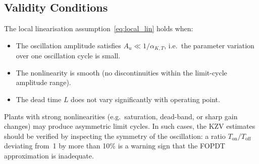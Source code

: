 \subsection{Validity Conditions}
\label{sec:nonlinear:validity}

The local linearisation assumption~\eqref{eq:local_lin} holds when:

\begin{itemize}
    \item The oscillation amplitude satisfies $A_u \ll 1/\alpha_{K,T}$,
          i.e.\ the parameter variation over one oscillation cycle is small.
    \item The nonlinearity is smooth (no discontinuities within the limit-cycle
          amplitude range).
    \item The dead time $L$ does not vary significantly with operating point.
\end{itemize}

Plants with strong nonlinearities (e.g.\ saturation, dead-band, or sharp
gain changes) may produce asymmetric limit cycles.
In such cases, the KZV estimates should be verified by inspecting the
symmetry of the oscillation: a ratio $T_{\text{on}} / T_{\text{off}}$
deviating from~1 by more than 10\% is a warning sign that the FOPDT
approximation is inadequate.
